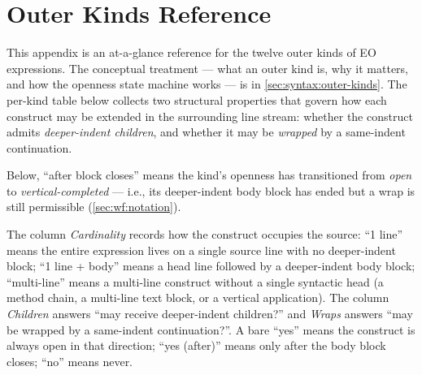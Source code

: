 
\section{Outer Kinds Reference}\label{app:outer-kinds}

This appendix is an at-a-glance reference for the twelve outer kinds of
  EO expressions.
The conceptual treatment --- what an outer kind is, why it matters, and
  how the openness state machine works --- is in
  \cref{sec:syntax:outer-kinds}.
The per-kind table below collects two structural properties that govern
  how each construct may be extended in the surrounding line stream:
  whether the construct admits \emph{deeper-indent children},
  and whether it may be \emph{wrapped} by a same-indent
   continuation.

Below, \enquote{after block closes} means the kind's openness has
  transitioned from \emph{open} to \emph{vertical-completed} ---
  i.e., its deeper-indent body block has ended but a 
  wrap is still permissible (\cref{sec:wf:notation}).

The column \emph{Cardinality} records how the construct occupies the
  source:
  \enquote{1 line} means the entire expression lives on a single source
  line with no deeper-indent block;
  \enquote{1 line + body} means a head line followed by a deeper-indent
  body block;
  \enquote{multi-line} means a multi-line construct without a single
  syntactic head (a method chain, a multi-line text block, or a vertical
  application).
The column \emph{Children} answers \enquote{may receive deeper-indent
  children?} and \emph{Wraps} answers \enquote{may be wrapped by a
  same-indent  continuation?}.
A bare \enquote{yes} means the construct is always open in that
  direction; \enquote{yes (after)} means only after the body block
  closes; \enquote{no} means never.

